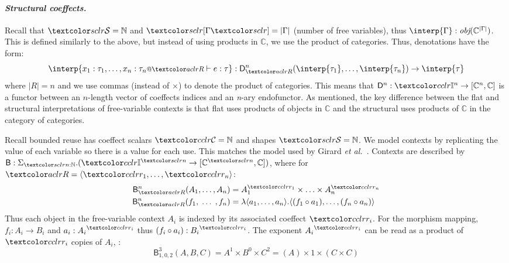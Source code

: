 \paragraph{\textnormal{\emph{Structural coeffects.}}}
Recall that $\SH = \mathbb{N}$ and $\mksh{\Gamma} = |\Gamma|$
(number of free variables), thus 
$\interp{\Gamma} : \emph{obj}(\mathbb{C}^{|\Gamma|})$. This is defined similarly 
to the above, but instead of using products in $\mathbb{C}$, %
we use the product of categories. %
%
%
Thus, denotations have the form: 
$$
\interp{\coctx{x_1 : \tau_1, \ldots, x_n : \tau_n}{\aclrd{R}} \vdash e : \tau} : \D^n_{\aclrd{R}}
(\interp{\tau_1}, \ldots, \interp{\tau_n}) \rightarrow \interp{\tau}
$$
where $|R| = n$ and we use commas (instead of $\times$) to denote the product
of categories. %
This means that $\D^n : \Icat^n \rightarrow [\mathbb{C}^n,
\mathbb{C}]$ is a functor between an $n$-length vector of coeffects
indices and an \emph{n}-ary endofunctor.
As mentioned, the key
difference between the flat and structural interpretations of
free-variable contexts is that flat uses products of objects in
$\mathbb{C}$ and the structural uses products of $\mathbb{C}$ in 
the category of categories. %

\newcommand{\BLL}{\mathsf{B}}

\begin{example} Recall
bounded reuse has coeffect scalars $\C = \mathbb{N}$ and shapes $\SH = \mathbb{N}$.
We model contexts by replicating the value of each variable so 
there is a value for each use. This matches the model used by 
Girard \emph{et al.}~\cite{girard1992bounded}. Contexts are described by 
 $\BLL : \Sigma_{\sclrd{n} : \mathbb{N}}. (\Icat^{\sclrd{n}} \rightarrow [\mathbb{C}^{\sclrd{n}}, \mathbb{C}])$, 
where for $\aclrd{R} = \langle{\cclrd{r_1}, \ldots, \cclrd{r_n}}\rangle$: 
\begin{align*}
\BLL^n_{\aclrd{R}} (A_1, \ldots, A_n) & = A_1^{\cclrd{r_1}} \times \ldots \times A_n^{\cclrd{r_n}} \\
\BLL^n_{\aclrd{R}} (f_1, \;\ldots\;, f_n) & = \lambda \langle{a_1, \ldots, a_n}\rangle . \langle{(f_1 \circ a_1), \ldots, (f_n \circ a_n)}\rangle
\end{align*}
%
Thus each object in the free-variable context $A_i$ is indexed by its associated coeffect $\cclrd{r_i}$.
For the morphism mapping, $f_i : A_i \rightarrow B_i$ and $a_i : {A_i}^{\cclrd{r_i}}$ thus $(f_i \circ a_i) : {B_i}^{\cclrd{r_i}}$. 
The exponent ${A_i}^{\cclrd{r_i}}$ can be read as a product of $\cclrd{r_i}$ copies of $A_i$, \eg:
$$\BLL^3_{1,0,2} (A, B, C) = A^1 \times B^0 \times C^2 = (A) \times 1 \times (C \times C)$$
\label{exm:bll1}
\end{example}


